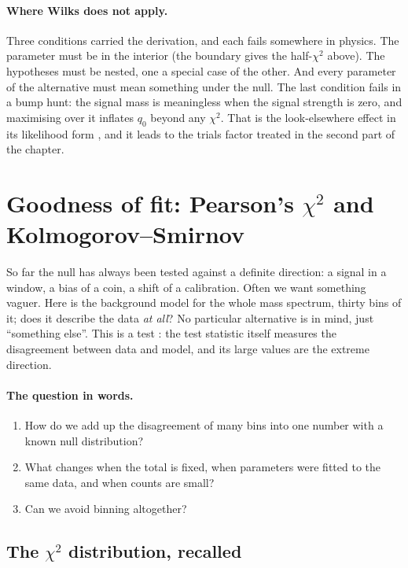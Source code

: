 \paragraph{Where Wilks does not apply.}
Three conditions carried the derivation, and each fails somewhere in physics.
The parameter must be in the interior (the boundary gives the half-$\chi^2$
above). The hypotheses must be nested, one a special case of the other. And
every parameter of the alternative must mean something under the null. The last
condition fails in a bump hunt: the signal mass is meaningless when the signal
strength is zero, and maximising over it inflates $q_0$ beyond any $\chi^2$.
That is the look-elsewhere effect in its likelihood form
\cite{GrossVitells2010}, and it leads to the trials factor treated in the second part of the chapter.
\section{Goodness of fit: Pearson's $\chi^2$ and Kolmogorov--Smirnov}
\label{4a:sec:gof}

So far the null has always been tested against a definite direction: a
signal in a window, a bias of a coin, a shift of a calibration. Often we want
something vaguer. Here is the background model for the whole mass spectrum,
thirty bins of it; does it describe the data \emph{at all}? No particular
alternative is in mind, just ``something else''. This is a
 test : the test statistic
itself measures the disagreement between data and model, and its large values
are the extreme direction.

\paragraph{The question in words.}
\begin{enumerate}[label=\arabic*.]
  \item How do we add up the disagreement of many bins into one number with a
        known null distribution?
  \item What changes when the total is fixed, when parameters were fitted to
        the same data, and when counts are small?
  \item Can we avoid binning altogether?
\end{enumerate}

\subsection{The $\chi^2$ distribution, recalled}
\label{4a:sec:chi2-dist}


